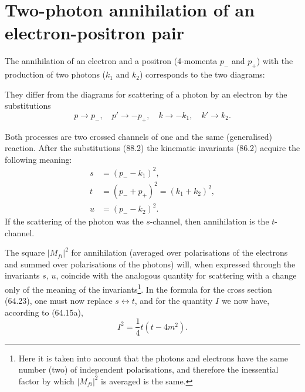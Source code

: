 
\section{Two-photon annihilation of an electron-positron pair}


The annihilation of an electron and a positron (4-momenta $p_-$ and $p_+$) with the production of two photons ($k_1$ and $k_2$) corresponds to the two diagrams:
\setcounter{equation}{1}

They differ from the diagrams for scattering of a photon by an electron by the substitutions
\begin{equation}
p \to p_-, \quad p' \to -p_+, \quad k \to -k_1, \quad k' \to k_2.
\label{eq:88.2}
\end{equation}

Both processes are two crossed channels of one and the same (generalised) reaction. After the substitutions (88.2) the kinematic invariants (86.2) acquire the following meaning:
\begin{equation}
\begin{aligned}
s &= (p_- - k_1)^2, \\
t &= (p_- + p_+)^2 = (k_1 + k_2)^2, \\
u &= (p_- - k_2)^2.
\end{aligned}
\label{eq:88.3}
\end{equation}
If the scattering of the photon was the $s$-channel, then annihilation is the $t$-channel.

The square $|M_{fi}|^2$ for annihilation (averaged over polarisations of the electrons and summed over polarisations of the photons) will, when expressed through the invariants $s$, $u$, coincide with the analogous quantity for scattering with a change only of the meaning of the invariants\footnote{Here it is taken into account that the photons and electrons have the same number (two) of independent polarisations, and therefore the inessential factor by which $|M_{fi}|^2$ is averaged is the same.}. In the formula for the cross section (64.23), one must now replace $s \leftrightarrow t$, and for the quantity $I$ we now have, according to (64.15a),
\[
I^2 = \frac{1}{4}t(t - 4m^2).
\]

